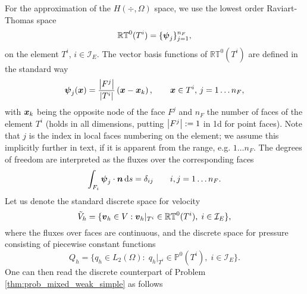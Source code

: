 For the approximation of the $H(\div,\Omega)$ space, we use the lowest order Raviart-Thomas space
\begin{equation}
    \mathbb{RT}^0(T^i) = \{\mathbf{\boldsymbol{\psi}}_j\}_{j=1}^{n_F}, 
\end{equation}
on the element $T^i$, $i\in\mathcal{I}_E$. The vector basis functions of $\mathbb{RT}^0(T^i)$
are defined in the standard way
\begin{equation}
    \mathbf{\boldsymbol{\psi}}_j(\mathbf{\boldsymbol{x}}) = \frac{\left|F^j\right|}{\left|T^i\right|} \left( \mathbf{\boldsymbol{x}} - \mathbf{\boldsymbol{x}}_k \right), \qquad \mathbf{\boldsymbol{x}}\in T^i,\, j=1\ldots n_F,
\end{equation}
with $\mathbf{\boldsymbol{x}}_k$ being the opposite node of the face $F^j$ and $n_F$ the number of faces of the element $T^i$
(holds in all dimensions, putting $\left|F^j\right|:=1$ in 1d for point faces).
Note that $j$ is the index in local faces numbering on the element; we assume this implicitly further in text, 
if it is apparent from the range, e.g. $1\ldots n_F$.
The degrees of freedom are interpreted as the fluxes over the corresponding faces
\begin{equation} \label{eqn:rt0_delta_property}
    \int_{F_i} \mathbf{\boldsymbol{\psi}}_j \cdot \mathbf{\boldsymbol{n}} \,{\rm d} s = \delta_{ij} \qquad i,j=1\ldots n_F.
\end{equation}
Let us denote the standard discrete space for velocity
\begin{equation}
    \tilde V_h = \{\mathbf{\boldsymbol{v}}_h\in V: \mathbf{\boldsymbol{v}}_h|_{T^i} \in \mathbb{RT}^0(T^i),\; i\in\mathcal{I}_E \},
\end{equation}
where the fluxes over faces are continuous,
and the discrete space for pressure consisting of piecewise constant functions
\begin{equation}
    Q_h=\{q_h\in L_2(\Omega):\; q_h|_{T^i}\in \mathbb{P}^0(T^i),\; i\in\mathcal{I}_E\}.
\end{equation}
One can then read the discrete counterpart of Problem \ref{thm:prob_mixed_weak_simple} as follows

